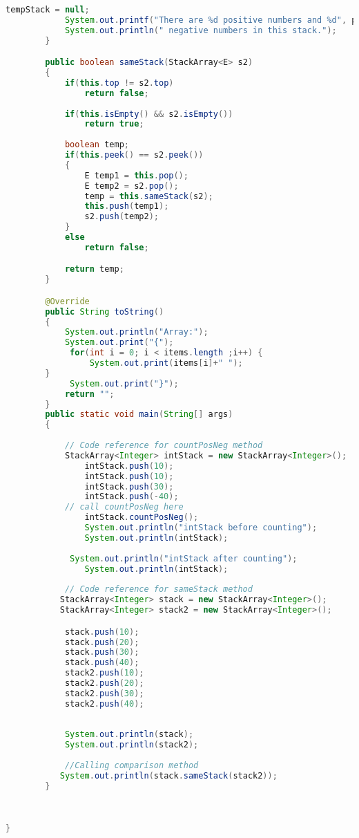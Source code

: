 \documentclass{article}
\begin{document}
\begin{lstlisting}[language=java]
			tempStack = null;
			System.out.printf("There are %d positive numbers and %d", posiCount, negaCount);
			System.out.println(" negative numbers in this stack.");
		}

		public boolean sameStack(StackArray<E> s2)
		{
			if(this.top != s2.top)
				return false;
				
			if(this.isEmpty() && s2.isEmpty())
				return true;
			
			boolean temp;
			if(this.peek() == s2.peek())
			{
				E temp1 = this.pop();
				E temp2 = s2.pop();
				temp = this.sameStack(s2);
				this.push(temp1);
				s2.push(temp2);
			}
			else
				return false;

			return temp;
		}

		@Override
		public String toString()
		{
			System.out.println("Array:");
			System.out.print("{");
			 for(int i = 0; i < items.length ;i++) {
				 System.out.print(items[i]+" ");
		}
			 System.out.print("}");
			return "";
		}
		public static void main(String[] args) 
		{
			
			// Code reference for countPosNeg method
			StackArray<Integer> intStack = new StackArray<Integer>();
				intStack.push(10);
				intStack.push(10);
				intStack.push(30);
				intStack.push(-40);
			// call countPosNeg here
				intStack.countPosNeg();
				System.out.println("intStack before counting");
				System.out.println(intStack);
			
			 System.out.println("intStack after counting");
				System.out.println(intStack);
				
			// Code reference for sameStack method
		   StackArray<Integer> stack = new StackArray<Integer>();
		   StackArray<Integer> stack2 = new StackArray<Integer>();

			stack.push(10);
			stack.push(20);
			stack.push(30);
			stack.push(40);
			stack2.push(10);
			stack2.push(20);
			stack2.push(30);
			stack2.push(40);
			 
		   
			System.out.println(stack);
			System.out.println(stack2);
			
			//Calling comparison method
		   System.out.println(stack.sameStack(stack2)); 
		}

				
				
}

\end{lstlisting}
\end{document}

